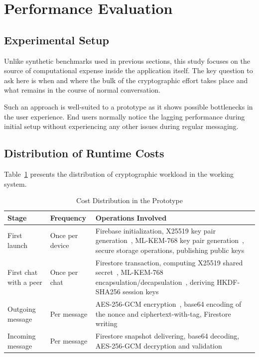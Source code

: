 \section{Performance Evaluation}

\subsection{Experimental Setup}
Unlike synthetic benchmarks used in previous sections, this study focuses on the source of computational expense inside the application itself. The key question to ask here is when and where the bulk of the cryptographic effort takes place and what remains in the course of normal conversation.

Such an approach is well-suited to a prototype as it shows possible bottlenecks in the user experience. End users normally notice the lagging performance during initial setup without experiencing any other issues during regular messaging.

\subsection{Distribution of Runtime Costs}
Table~\ref{tab:latency} presents the distribution of cryptographic workload in the working system.

\begin{table}[htbp]
\centering
\caption{Cost Distribution in the Prototype}
\label{tab:latency}
\small
\setlength{\tabcolsep}{4pt}
\begin{tabularx}{\columnwidth}{@{}l l X@{}}
\toprule
\textbf{Stage} & \textbf{Frequency} & \textbf{Operations Involved} \\
\midrule
First launch & Once per device & Firebase initialization, X25519 key pair generation~\cite{rfc7748}, ML-KEM-768 key pair generation~\cite{fips203}, secure storage operations, publishing public keys \\
First chat with a peer & Once per chat & Firestore transaction, computing X25519 shared secret~\cite{rfc7748}, ML-KEM-768 encapsulation/decapsulation~\cite{fips203}, deriving HKDF-SHA256 session keys \\
Outgoing message & Per message & AES-256-GCM encryption~\cite{gcm}, base64 encoding of the nonce and ciphertext-with-tag, Firestore writing \\
Incoming message & Per message & Firestore snapshot delivering, base64 decoding, AES-256-GCM decryption and validation~\cite{gcm} \\
\bottomrule
\end{tabularx}
\end{table}

